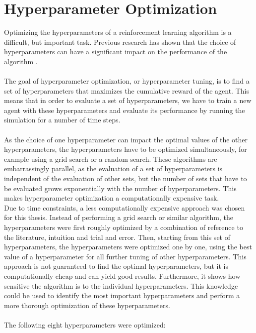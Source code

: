 \section{Hyperparameter Optimization}
\label{sec:hyperparam_optim}
Optimizing the hyperparameters of a reinforcement learning algorithm is a difficult, but important task. Previous research has shown that the choice of hyperparameters can have a significant impact on the performance of the algorithm \cite{henderson_deep_2019,parker-holder_automated_2022,noauthor_automl_nodate}. 
\\
\\
The goal of hyperparameter optimization, or hyperparameter tuning, is to find a set of hyperparameters that maximizes the cumulative reward of the agent. This means that in order to evaluate a set of hyperparameters, we have to train a new agent with these hyperparameters and evaluate its performance by running the simulation for a number of time steps. 
\\
\\
As the choice of one hyperparameter can impact the optimal values of the other hyperparameters, the hyperparameters have to be optimized simultaneously, for example using a grid search or a random search. These algorithms are embarrassingly parallel, as the evaluation of a set of hyperparameters is independent of the evaluation of other sets, but the number of sets that have to be evaluated grows exponentially with the number of hyperparameters. This makes hyperparameter optimization a computationally expensive task.
\\
Due to time constraints, a less computationally expensive approach was chosen for this thesis. Instead of performing a grid search or similar algorithm, the hyperparameters were first roughly optimized by a combination of reference to the literature, intuition and trial and error. Then, starting from this set of hyperparameters, the hyperparameters were optimized one by one, using the best value of a hyperparameter for all further tuning of other hyperparameters. This approach is not guaranteed to find the optimal hyperparameters, but it is computationally cheap and can yield good results. Furthermore, it shows how sensitive the algorithm is to the individual hyperparameters. This knowledge could be used to identify the most important hyperparameters and perform a more thorough optimization of these hyperparameters.
\\
\\
The following eight hyperparameters were optimized:
